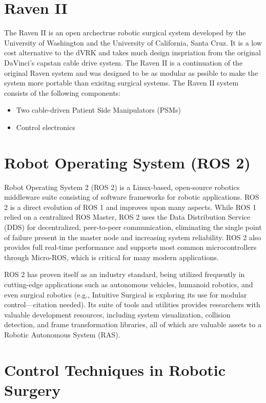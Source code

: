 \section{Raven II}

The Raven II is an open archectrue robotic surgical system developed  by the University of Washington and the University of California, Santa Cruz. It is a low cost alternative to the dVRK and takes much design inspriation from the original DaVinci's capstan cable drive system. The Raven II is a continuation of the original Raven system and was designed to be as modular as pssible to make the system more portable than exisitng surgical systems. The Raven II system consists of the following components:

\begin{itemize}
    \item Two cable-driven Patient Side Manipulators (PSMs)
    \item Control electronics
\end{itemize}

\section{Robot Operating System (ROS 2)}

Robot Operating System 2 (ROS 2) is a Linux-based, open-source robotics middleware suite consisting of software frameworks for robotic applications. ROS 2 is a direct evolution of ROS 1 and improves upon many aspects. While ROS 1 relied on a centralized ROS Master, ROS 2 uses the Data Distribution Service (DDS) for decentralized, peer-to-peer communication, eliminating the single point of failure present in the master node and increasing system reliability. ROS 2 also provides full real-time performance and supports most common microcontrollers through Micro-ROS, which is critical for many modern applications.

ROS 2 has proven itself as an industry standard, being utilized frequently in cutting-edge applications such as autonomous vehicles, humanoid robotics, and even surgical robotics (e.g., Intuitive Surgical is exploring its use for modular control—citation needed). Its suite of tools and utilities provides researchers with valuable development resources, including system visualization, collision detection, and frame transformation libraries, all of which are valuable assets to a Robotic Autonomous System (RAS).

\section{Control Techniques in Robotic Surgery}

